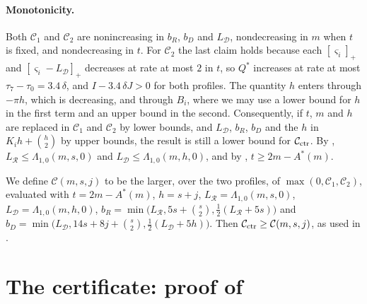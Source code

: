 \documentclass[11pt,colorlinks]{charlie}
\newcommand{\cR}{\mathcal{R}}
\newcommand{\cD}{\mathcal{D}}
\newcommand{\pos}[1]{\left[#1\right]_+}
\begin{document}
\paragraph{Monotonicity.} Both $\mathcal C_1$ and $\mathcal C_2$ are nonincreasing in $b_R$, $b_D$ and $L_\cD$, nondecreasing in $m$ when $t$ is fixed, and nondecreasing in $t$. For $\mathcal C_2$ the last claim holds because each $\pos{\varsigma_i}$ and $\pos{\varsigma_i-L_\cD}$ decreases at rate at most $2$ in $t$, so $Q^*$ increases at rate at most $\tau_7-\tau_0=3.4\,\delta$, and $I-3.4\,\delta J>0$ for both profiles. The quantity $h$ enters through $-\pi h$, which is decreasing, and through $B_i$, where we may use a lower bound for $h$ in the first term and an upper bound in the second. Consequently, if $t$, $m$ and $h$ are replaced in $\mathcal C_1$ and $\mathcal C_2$ by lower bounds, and $L_\cD$, $b_R$, $b_D$ and the $h$ in $K_ih+\binom h2$ by upper bounds, the result is still a lower bound for $\mathcal C_{\rm ctr}$. By , $L_\cR\le\Lambda_{1,0}(m,s,0)$ and $L_\cD\le\Lambda_{1,0}(m,h,0)$, and by , $t\ge2m-A^*(m)$.

We define $\mathcal C(m,s,j)$ to be the larger, over the two profiles, of $\max(0,\mathcal C_1,\mathcal C_2)$, evaluated with $t=2m-A^*(m)$, $h=s+j$, $L_\cR=\Lambda_{1,0}(m,s,0)$, $L_\cD=\Lambda_{1,0}(m,h,0)$, $b_R=\min\big(L_\cR,5s+\binom s2,\frac12(L_\cR+5s)\big)$ and $b_D=\min\big(L_\cD,14s+8j+\binom s2,\frac12(L_\cD+5h)\big)$. Then $\mathcal C_{\rm ctr}\ge\mathcal C(m,s,j)$, as used in .

\section{The certificate: proof of }\label{sec:certificate}
\end{document}
